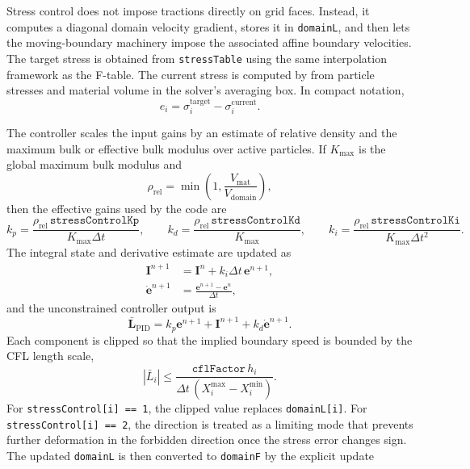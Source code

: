 Stress control does not impose tractions directly on grid faces.  Instead, it computes a diagonal domain velocity gradient, stores it in \texttt{domainL}, and then lets the moving-boundary machinery impose the associated affine boundary velocities.  The target stress is obtained from \texttt{stressTable} using the same interpolation framework as the F-table.  The current stress is computed by  from particle stresses and material volume in the solver's averaging box.  In compact notation,
\begin{equation}
  e_i = \sigma_i^{\mathrm{target}}-\sigma_i^{\mathrm{current}}.
  \label{eq:bc-stress-control-error}
\end{equation}

The controller scales the input gains by an estimate of relative density and the maximum bulk or effective bulk modulus over active particles.  If $K_{\max}$ is the global maximum bulk modulus and
\begin{equation}
  \rho_{\mathrm{rel}}=\min\left(1,\frac{V_{\mathrm{mat}}}{V_{\mathrm{domain}}}\right),
\end{equation}
then the effective gains used by the code are
\begin{equation}
  k_p=\frac{\rho_{\mathrm{rel}}\,\texttt{stressControlKp}}{K_{\max}\Delta t},
  \qquad
  k_d=\frac{\rho_{\mathrm{rel}}\,\texttt{stressControlKd}}{K_{\max}},
  \qquad
  k_i=\frac{\rho_{\mathrm{rel}}\,\texttt{stressControlKi}}{K_{\max}\Delta t^2}.
  \label{eq:bc-stress-control-scaled-gains}
\end{equation}
The integral state and derivative estimate are updated as
\begin{align}
  \mathbf{I}^{n+1} &= \mathbf{I}^{n}+k_i\Delta t\,\mathbf{e}^{n+1},\\
  \dot{\mathbf{e}}^{n+1} &= \frac{\mathbf{e}^{n+1}-\mathbf{e}^{n}}{\Delta t},
\end{align}
and the unconstrained controller output is
\begin{equation}
  \bar{\mathbf{L}}_{\mathrm{PID}} = k_p\mathbf{e}^{n+1}+\mathbf{I}^{n+1}+k_d\dot{\mathbf{e}}^{n+1}.
  \label{eq:bc-stress-control-pid}
\end{equation}
Each component is clipped so that the implied boundary speed is bounded by the CFL length scale,
\begin{equation}
  |\bar L_i| \le \frac{\texttt{cflFactor}\,h_i}{\Delta t\,(X_i^{\max}-X_i^{\min})}.
  \label{eq:bc-stress-control-cfl-limit}
\end{equation}
For \texttt{stressControl[i] == 1}, the clipped value replaces \texttt{domainL[i]}.  For \texttt{stressControl[i] == 2}, the direction is treated as a limiting mode that prevents further deformation in the forbidden direction once the stress error changes sign.  The updated \texttt{domainL} is then converted to \texttt{domainF} by the explicit update
